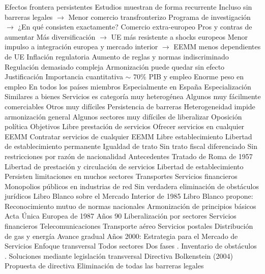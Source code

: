 \documentclass{nuevotema}
\begin{document}
\begin{esquemal}
			\3 Efectos frontera persistentes
				\4 Estudios muestran de forma recurrente
				\4[] Incluso sin barreras legales
				\4[] $\to$ Menor comercio transfronterizo
				\4[] Programa de investigación
				\4[] $\to$ ¿En qué consisten exactamente?
			\3 Comercio extra-europeo
				\4 Pros y contras de aumentar
				\4[] Más diversificación
				\4[] $\to$ UE más resistente a shocks europeos
				\4[] Menor impulso a integración europea y mercado interior
				\4[] $\to$ EEMM menos dependientes de UE
			\3 Inflación regulatoria
				\4 Aumento de reglas y normas indiscriminado
				\4 Regulación demasiado compleja
				\4[$\then$] Armonización puede quedar sin efecto
	\1 
		\2 Justificación
			\3 Importancia cuantitativa
				\4 $\sim$ $70\%$ PIB y empleo
				\4 Enorme peso en empleo
				\4[] En todos los países miembros
				\4[] Especialmente en España
			\3 Especialización
				\4 Similares a bienes
				\4 Servicios es categoría muy heterogénea
				\4[] Algunos muy fácilmente comerciables
				\4[] Otros muy difíciles
			\3 Persistencia de barreras
				\4 Heterogeneidad impide armonización general
				\4 Algunos sectores muy difíciles de liberalizar
				\4[] Oposición política
		\2 Objetivos
			\3 Libre prestación de servicios
				\4 Ofrecer servicios en cualquier EEMM
				\4 Contratar servicios de cualquier EEMM
			\3 Libre establecimiento
				\4 Libertad de establecimiento permanente
			\3 Igualdad de trato
				\4 Sin trato fiscal diferenciado
				\4 Sin restricciones por razón de nacionalidad
		\2 Antecedentes
			\3 Tratado de Roma de 1957
				\4 Libertad de prestación y circulación de servicios
				\4 Libertad de establecimiento
				\4 Persisten limitaciones en muchos sectores
				\4[] Transportes
				\4[] Servicios financieros
				\4[] Monopolios públicos en industrias de red
				\4 Sin verdadera eliminación de obstáculos jurídicos
			\3 Libro Blanco sobre el Mercado Interior de 1985
				\4 Libro Blanco propone:
				\4[] Reconocimiento mutuo de normas nacionales
				\4[] Armonización de principios básicos
			\3 Acta Única Europea de 1987
			\3 Años 90
				\4 Liberalización por sectores
				\4[] Servicios financieros
				\4[] Telecomunicaciones
				\4[] Transporte aéreo
				\4[] Servicios postales
				\4[] Distribución de gas y energía
				\4 Avance gradual
			\3 Años 2000: Estrategia para el Mercado de Servicios
				\4 Enfoque transversal
				\4[] Todos sectores
				\4 Dos fases
				. Inventario de obstáculos
				. Soluciones mediante legislación transversal
			\3 Directiva Bolkenstein (2004)
				\4 Propuesta de directiva
				\4 Eliminación de todas las barreras legales

\end{esquemal}
\end{document}
